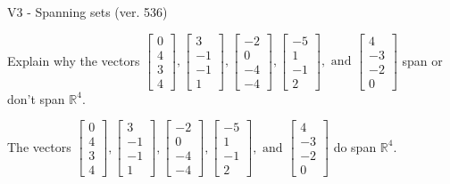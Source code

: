 \begin{exercise}
  \begin{exerciseTitle}V3 - Spanning sets (ver. 536)\end{exerciseTitle}
  \begin{exerciseStatement}
    Explain why the vectors \(\left[\begin{array}{r}
0 \\
4 \\
3 \\
4
\end{array}\right] , \left[\begin{array}{r}
3 \\
-1 \\
-1 \\
1
\end{array}\right] , \left[\begin{array}{r}
-2 \\
0 \\
-4 \\
-4
\end{array}\right] , \left[\begin{array}{r}
-5 \\
1 \\
-1 \\
2
\end{array}\right] , \text{ and } \left[\begin{array}{r}
4 \\
-3 \\
-2 \\
0
\end{array}\right]\) span or don't span \(\mathbb{R}^4\). 
	


  \end{exerciseStatement}
  \begin{exerciseAnswer}
   The vectors \(\left[\begin{array}{r}
0 \\
4 \\
3 \\
4
\end{array}\right] , \left[\begin{array}{r}
3 \\
-1 \\
-1 \\
1
\end{array}\right] , \left[\begin{array}{r}
-2 \\
0 \\
-4 \\
-4
\end{array}\right] , \left[\begin{array}{r}
-5 \\
1 \\
-1 \\
2
\end{array}\right] , \text{ and } \left[\begin{array}{r}
4 \\
-3 \\
-2 \\
0
\end{array}\right]\) 
  	 do  
	span \(\mathbb{R}^4\).
  



\end{exerciseAnswer}
\end{exercise}
